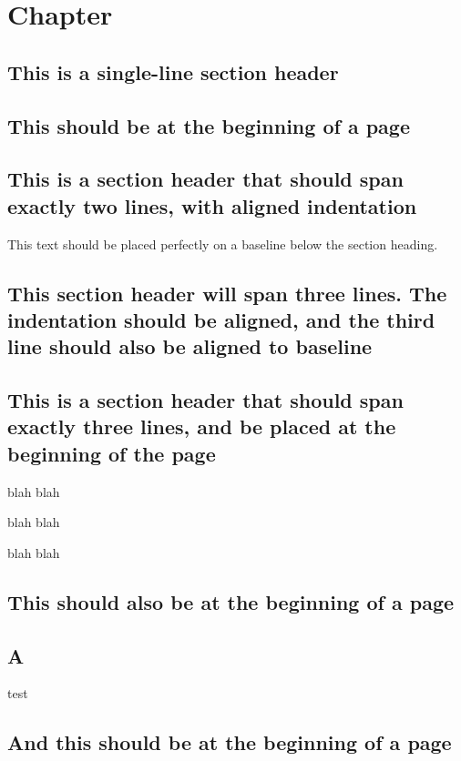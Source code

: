 \documentclass[baselinegrid,nocopyright]{uit-thesis-test}
\begin{document}
\mainmatter

\chapter{Chapter}
\lipsum[1]

\section{This is a single-line section header}
\lipsum[3-7]

\section{This should be at the beginning of a page}
\lipsum[8]

\section{This is a section header that should span exactly two lines, with aligned indentation}
This text should be placed perfectly on a baseline below the section heading.

\lipsum[9]

\section{This section header will span three lines. The indentation should be aligned, and the third line should also be aligned to baseline}
\lipsum[10-14]

\section{This is a section header that should span exactly three lines, and be placed at the beginning of the page}

\lipsum[15-17]

blah blah

blah blah

blah blah



\section{This should also be at the beginning of a page}
\section{A}
test

\newpage
\section{And this should be at the beginning of a page}
\end{document}
